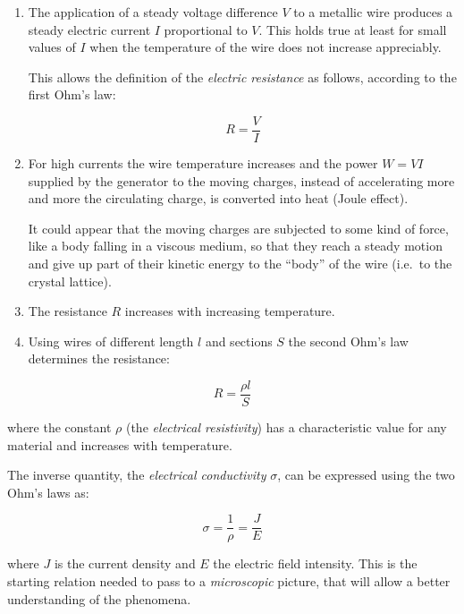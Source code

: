 \documentclass[]{book}
\begin{document}
\begin{enumerate}
\def\labelenumi{\arabic{enumi})}
\item
  The application of a steady voltage difference \(V\) to a metallic
  wire produces a steady electric current \(I\) proportional to \(V\).
  This holds true at least for small values of \(I\) when the
  temperature of the wire does not increase appreciably.

  This allows the definition of the \emph{electric resistance} as
  follows, according to the first Ohm's law:

  \begin{equation}
   R=\frac{ V }{ I }
   \label{eq:ohmLaw1}
   \end{equation}
\item
  For high currents the wire temperature increases and the power
  \(W=VI\) supplied by the generator to the moving charges, instead of
  accelerating more and more the circulating charge, is converted into
  heat (Joule effect).

  It could appear that the moving charges are subjected to some kind of
  force, like a body falling in a viscous medium, so that they reach a
  steady motion and give up part of their kinetic energy to the ``body''
  of the wire (i.e.~to the crystal lattice).
\item
  The resistance \(R\) increases with increasing temperature.
\item
  Using wires of different length \(l\) and sections \(S\) the second
  Ohm's law determines the resistance:
\end{enumerate}

\begin{equation}
R= \frac{ \rho l}{S} 
\label{eq:ohmLaw2}
\end{equation}

where the constant \(\rho\) (the \emph{electrical resistivity}) has a
characteristic value for any material and increases with temperature.

The inverse quantity, the \emph{electrical conductivity} \(\sigma\), can
be expressed using the two Ohm's laws as:

\begin{equation}
\sigma = \frac{1}{ \rho }=\frac{J}{E}
\label{eq:conductivity}
\end{equation}

where \(J\) is the current density and \(E\) the electric field
intensity. This is the starting relation needed to pass to a
\emph{microscopic} picture, that will allow a better understanding of
the phenomena.
\end{document}
